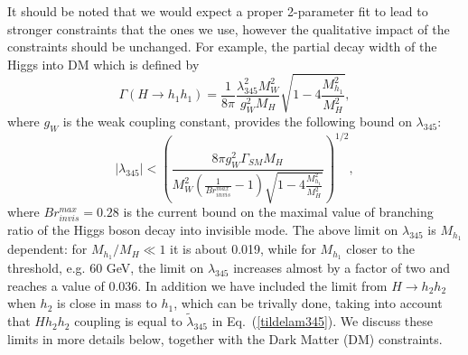 It should be noted that we would expect a proper 2-parameter 
fit to lead to stronger constraints that the ones we use, however the qualitative impact of the constraints should be unchanged.
For example, the partial decay width of the Higgs into  DM which is defined by
\begin{equation}
 \Gamma (H \to h_1 h_1) = \frac{1}{8\pi}\frac{\lambda_{345}^2 M_W^2}{g_W^2 M_H}\sqrt{1-4\frac{M_{h_1}^2}{M_H^2}},
\end{equation}
where $g_W$ is the weak coupling constant,  provides the following  bound on $\lambda_{345}$:
\begin{equation}
|\lambda_{345}| < 
\left(
\frac{8\pi g_W^2 \Gamma_{SM} M_H}{M_W^2 \left(\frac{1}{Br^{max}_{invis}}-1\right)\sqrt{1-4\frac{M_{h_1}^2}{M_H^2}}}	
\right)^{1/2},\label{lam345-limit-from-inv}
\end{equation}
where $Br^{max}_{invis}=0.28$ is the current bound on the maximal value of branching ratio
of the Higgs boson decay into invisible mode.
The above limit on $\lambda_{345}$ is $M_{h_1}$ dependent:
for  $M_{h_1}/M_{H} \ll 1$  it is about 0.019, while for  $M_{h_1}$ closer to the threshold,
e.g. 60 GeV, the limit on  $\lambda_{345}$ increases almost by a factor of two and reaches a value of 0.036.
In addition we have included the limit from $H\to h_2 h_2$
when $h_2$ is close in mass to $h_1$, which can be trivally done, taking into account that
$H h_2 h_2$ coupling is equal to $\tilde \lambda_{345}$ in Eq.~(\ref{tildelam345}).
We discuss these limits in more details below, together with the Dark Matter (DM) constraints.

